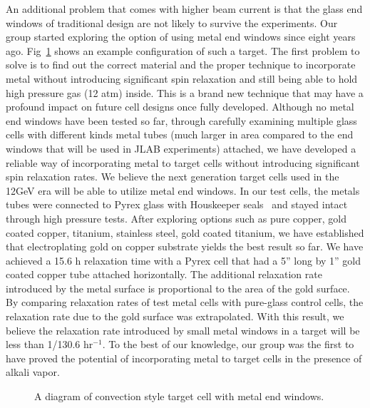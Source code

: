 An additional problem that comes with higher beam current is that the glass end windows of traditional design are not likely to survive the experiments. Our group started exploring the option of using metal end windows since eight years ago. Fig~\ref{metal_end_windows} shows an example configuration of such a target. The first problem to solve is to find out the correct material and the proper technique to incorporate metal without introducing significant spin relaxation and still being able to hold high pressure gas (12 atm) inside. This is a brand new technique that may have a profound impact on future cell designs once fully developed. Although no metal end windows have been tested so far, through carefully examining multiple glass cells with different kinds metal tubes (much larger in area compared to the end windows that will be used in JLAB experiments) attached, we have developed a reliable way of incorporating metal to target cells without introducing significant spin relaxation rates. We believe the next generation target cells used in the 12GeV era will be able to utilize metal end windows. In our test cells, the metals tubes were connected to Pyrex glass with Houskeeper seals~\cite{Houskeeper} and stayed intact through high pressure tests. After exploring options such as pure copper, gold coated copper, titanium, stainless steel, gold coated titanium, we have established that electroplating gold on copper substrate yields the best result so far. We have achieved a 15.6 h relaxation time with a Pyrex cell that had a 5'' long by 1'' gold coated copper tube attached horizontally. The additional relaxation rate introduced by the metal surface is proportional to the area of the gold surface. By comparing relaxation rates of test metal cells with pure-glass control cells, the relaxation rate due to the gold surface was extrapolated. With this result, we believe the relaxation rate introduced by small metal windows in a target will be less than 1/130.6 hr$^{-1}$. To the best of our knowledge, our group was the first to have proved the potential of incorporating metal to target cells in the presence of alkali vapor. 

\begin{figure}[t!]\label{metal_end_windows}
	\centering
	\caption{{A diagram of convection style target cell with metal end windows. }}
	\label{metal_end_windows}
\end{figure}

